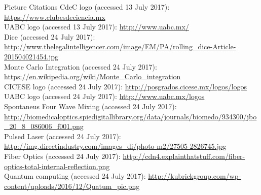 \documentclass{beamer}
\begin{document}
\begin{frame}{Picture Citations}
\fontsize{5}{4}\selectfont 
CdeC logo (accessed 13 July 2017): \href{https://www.clubesdeciencia.mx}{https://www.clubesdeciencia.mx}\\
UABC logo (accessed 13 July 2017): \href{http://www.uabc.mx/}{http://www.uabc.mx/}\\
Dice (accessed 24 July 2017): \href{http://www.thelegalintelligencer.com/image/EM/PA/rolling\_dice-Article-201504021454.jpg}{http://www.thelegalintelligencer.com/image/EM/PA/rolling\_dice-Article-201504021454.jpg}\\
Monte Carlo Integration (accessed 24 July 2017): \href{https://en.wikipedia.org/wiki/Monte\_Carlo\_integration}{https://en.wikipedia.org/wiki/Monte\_Carlo\_integration}\\
CICESE logo (accessed 24 July 2017): \href{http://posgrados.cicese.mx/logos/logos}{http://posgrados.cicese.mx/logos/logos}\\
UABC logo (accessed 24 July 2017): \href{http://www.uabc.mx/logos}{http://www.uabc.mx/logos}\\
Spontaneus Four Wave Mixing (accessed 24 July 2017): \href{http://biomedicaloptics.spiedigitallibrary.org/data/journals/biomedo/934300/jbo\_20\_8\_086006\_f001.png}{http://biomedicaloptics.spiedigitallibrary.org/data/journals/biomedo/934300/jbo\_20\_8\_086006\_f001.png}\\
Pulsed Laser (accessed 24 July 2017): \href{http://img.directindustry.com/images\_di/photo-m2/27505-2826745.jpg}{http://img.directindustry.com/images\_di/photo-m2/27505-2826745.jpg}\\
Fiber Optics (accessed 24 July 2017): \href{http://cdn4.explainthatstuff.com/fiber-optics-total-internal-reflection.png}{http://cdn4.explainthatstuff.com/fiber-optics-total-internal-reflection.png}\\
Quantum computing (accessed 24 July 2017): \href{http://kubrickgroup.com/wp-content/uploads/2016/12/Quatum\_pic.png}{http://kubrickgroup.com/wp-content/uploads/2016/12/Quatum\_pic.png}\\
\end{frame}
\end{document}
